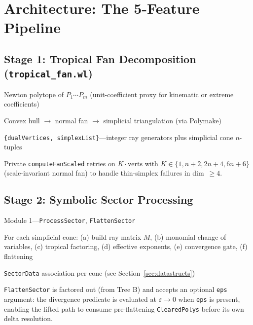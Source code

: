 \documentclass[11pt,a4paper]{article}
\begin{document}
\section{Architecture: The 5-Feature Pipeline}

\subsection{Stage 1: Tropical Fan Decomposition (\texttt{tropical\_fan.wl})}
\begin{description}[style=nextline]
  \item[Input:] Newton polytope of $P_1 \cdots P_m$ (unit-coefficient proxy for kinematic or extreme coefficients)
  \item[Process:] Convex hull $\to$ normal fan $\to$ simplicial triangulation (via Polymake)
  \item[Output:] \texttt{\{dualVertices, simplexList\}}---integer ray generators plus simplicial cone $n$-tuples
  \item[v3 addition:] Private \texttt{computeFanScaled} retries on $K\!\cdot\!\mathrm{verts}$ with $K\in\{1,n+2,2n+4,6n+6\}$ (scale-invariant normal fan) to handle thin-simplex failures in dim~$\geq 4$.
\end{description}

\subsection{Stage 2: Symbolic Sector Processing}
\begin{description}[style=nextline]
  \item[Source:] Module 1---\texttt{ProcessSector}, \texttt{FlattenSector}
  \item[Process:] For each simplicial cone: (a) build ray matrix $M$, (b) monomial change of variables, (c) tropical factoring, (d) effective exponents, (e) convergence gate, (f) flattening
  \item[Output:] \texttt{SectorData} association per cone (see Section~\ref{sec:datastructs})
\end{description}

\texttt{FlattenSector} is factored out (from Tree B) and accepts an optional \texttt{eps} argument: the divergence predicate is evaluated at $\varepsilon\to 0$ when \texttt{eps} is present, enabling the lifted path to consume pre-flattening \texttt{ClearedPolys} before its own delta resolution.
\end{document}
